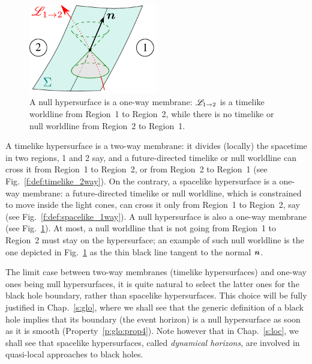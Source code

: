 \begin{figure}
\centerline{\includegraphics[width=0.5\textwidth]{def_null_1way.pdf}}
\caption[]{\label{f:def:null_1way} \footnotesize
A null hypersurface is a one-way membrane: $\mathscr{L}_{1\rightarrow 2}$ is
a timelike worldline from Region~1 to Region~2, while there is no timelike or null
worldline from Region~2 to Region~1.}
\end{figure}

A timelike hypersurface is a two-way membrane: it divides (locally)
the spacetime in two regions, 1 and 2 say, and a future-directed timelike or null
worldline can cross it from Region~1 to Region~2, or from Region~2 to Region~1
(see Fig.~\ref{f:def:timelike_2way}). On the contrary,
a spacelike hypersurface is a one-way membrane: a future-directed timelike or null
worldline, which is constrained to move inside the light cones,
can cross it only from Region~1 to Region~2, say (see Fig.~\ref{f:def:spacelike_1way}).
A null hypersurface is also a one-way membrane (see Fig.~\ref{f:def:null_1way}).
At most, a null worldline that is not going from Region~1 to Region~2 must
stay on the hypersurface; an example of such null worldline is
the one depicted in Fig.~\ref{f:def:null_1way} as the thin black line tangent to the normal $\bm{n}$.

The limit case between two-way membranes (timelike hypersurfaces)
and one-way ones being null hypersurfaces, it is quite natural to select the
latter ones for the black hole boundary, rather than spacelike hypersurfaces.
This choice will be fully justified in Chap.~\ref{s:glo}, where we shall see
that the generic definition of a black hole implies that its boundary
(the event horizon)
is a null hypersurface as soon as it is smooth (Property~\ref{p:glo:prop4}).
Note however that in Chap.~\ref{s:loc}, we shall see that spacelike hypersurfaces,
called \emph{dynamical
horizons}, are involved
in quasi-local approaches to black holes.


